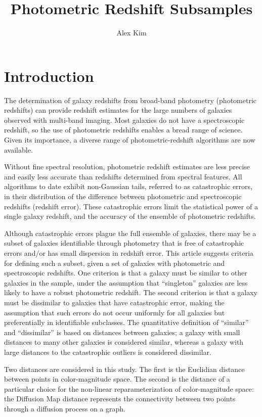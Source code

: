 \documentclass[preprint]{aastex}
\begin{document}
\title{Photometric Redshift Subsamples}
\author{Alex Kim}

\section{Introduction}

The determination of galaxy redshifts from broad-band photometry (photometric redshifts) can provide redshift estimates
for the large numbers of galaxies observed with multi-band imaging.  Most  galaxies do not have a
spectroscopic redshift, so the use of photometric redshifts enables a bread range of science.  
Given its importance, a diverse range of photometric-redshift algorithms are now available.

Without fine spectral resolution, photometric redshift estimates are less precise and easily less accurate than redshifts
determined from spectral features.  All algorithms to date exhibit non-Gaussian tails, referred to as catastrophic errors,
in their distribution of the difference between photometric and spectroscopic redshifts (redshift error).
These catastrophic errors limit
the statistical power of a single galaxy redshift, and the accuracy of the ensemble of photometric redshifts.

Although catastrophic errors plague the full ensemble of galaxies, there may be a subset of  galaxies identifiable through
photometry that is free of catastrophic errors and/or has small dispersion in redshift error.  This article suggests
criteria for defining such a subset, given a set of galaxies with
photometric and spectroscopic redshifts.  One criterion is that a galaxy must be similar to other galaxies in the sample,
under the assumption that ``singleton'' galaxies are less likely to have a robust photometric redshift.
The second criterion is that a galaxy must be dissimilar to galaxies that have catastrophic error, making the assumption
that such errors do not occur uniformly for all galaxies but preferentially in identifiable subclasses.
The quantitative definition of ``similar'' and ``dissimilar'' is based on distances between galaxies; a galaxy with small
distances to many other galaxies is considered similar, whereas a galaxy with large distances to the catastrophic outliers
is considered dissimilar.

Two distances are considered in this study.  The first is the Euclidian distance between points in color-magnitude
space.  The second is the distance of a particular choice for the non-linear reparameterization of color-magnitude space:
the Diffusion Map distance represents the connectivity between two points through a diffusion process on a graph.
\end{document}
